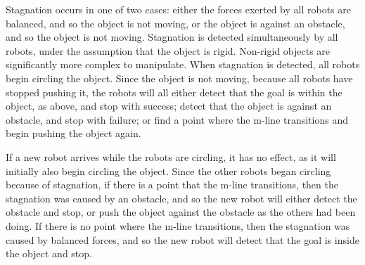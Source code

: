 Stagnation occurs in one of two cases: either the forces exerted by all robots are balanced, and so the object is not moving, or the object is against an obstacle, and so the object is not moving. 
Stagnation is detected simultaneously by all robots, under the assumption that the object is rigid.
Non-rigid objects are significantly more complex to manipulate. 
When stagnation is detected, all robots begin circling the object. 
Since the object is not moving, because all robots have stopped pushing it, the robots will all either detect that the goal is within the object, as above, and stop with success; detect that the object is against an obstacle, and stop with failure; or find a point where the m-line transitions and begin pushing the object again. 
 
If a new robot arrives while the robots are circling, it has no effect, as it will initially also begin circling the object. 
Since the other robots began circling because of stagnation, if there is a point that the m-line transitions, then the stagnation was caused by an obstacle, and so the new robot will either detect the obstacle and stop, or push the object against the obstacle as the others had been doing. 
If there is no point where the m-line transitions, then the stagnation was caused by balanced forces, and so the new robot will detect that the goal is inside the object and stop.  

%
%
%

